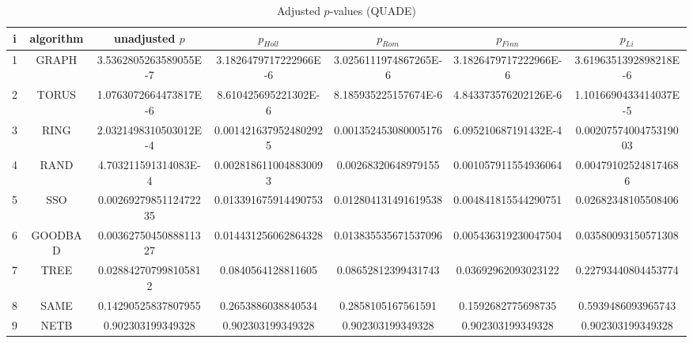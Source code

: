\documentclass[a4paper,10pt]{article}
\begin{document}
\begin{landscape}
\begin{table}[!htp]
\centering\scriptsize
\caption{Adjusted $p$-values (QUADE)}
\begin{tabular}{ccccccc}
i&algorithm&unadjusted $p$&$p_{Holl}$&$p_{Rom}$&$p_{Finn}$&$p_{Li}$\\
\hline
1& GRAPH&3.5362805263589055E-7&3.1826479717222966E-6&3.0256111974867265E-6&3.1826479717222966E-6&3.6196351392898218E-6\\
2& TORUS&1.0763072664473817E-6&8.610425695221302E-6&8.185935225157674E-6&4.843373576202126E-6&1.1016690433414037E-5\\
3& RING&2.0321498310503012E-4&0.0014216379524802925&0.001352453080005176&6.095210687191432E-4&0.0020757400475319003\\
4& RAND&4.703211591314083E-4&0.0028186110048830093&0.00268320648979155&0.001057911554936064&0.004791025248174686\\
5& SSO&0.0026927985112472235&0.013391675914490753&0.012804131491619538&0.004841815544290751&0.02682348105508406\\
6& GOODBAD&0.0036275045088811327&0.014431256062864328&0.013835535671537096&0.005436319230047504&0.03580093150571308\\
7& TREE&0.028842707998105812&0.0840564128811605&0.08652812399431743&0.03692962093023122&0.22793440804453774\\
8& SAME&0.14290525837807955&0.2653886038840534&0.2858105167561591&0.1592682775698735&0.5939486093965743\\
9& NETB&0.902303199349328&0.902303199349328&0.902303199349328&0.902303199349328&0.902303199349328\\
\hline
\end{tabular}
\end{table}

\end{landscape}
\end{document}
